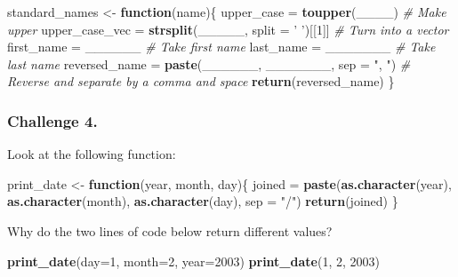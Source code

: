 \documentclass[]{book}
\newenvironment{Shaded}{\begin{snugshade}}{\end{snugshade}}
\newcommand{\KeywordTok}[1]{\textcolor[rgb]{0.13,0.29,0.53}{\textbf{#1}}}
\newcommand{\DataTypeTok}[1]{\textcolor[rgb]{0.13,0.29,0.53}{#1}}
\newcommand{\DecValTok}[1]{\textcolor[rgb]{0.00,0.00,0.81}{#1}}
\newcommand{\StringTok}[1]{\textcolor[rgb]{0.31,0.60,0.02}{#1}}
\newcommand{\CommentTok}[1]{\textcolor[rgb]{0.56,0.35,0.01}{\textit{#1}}}
\newcommand{\ControlFlowTok}[1]{\textcolor[rgb]{0.13,0.29,0.53}{\textbf{#1}}}
\newcommand{\NormalTok}[1]{#1}
\begin{document}
\begin{Shaded}
\begin{Highlighting}[]
\NormalTok{standard_names <-}\StringTok{ }\ControlFlowTok{function}\NormalTok{(name)\{}
\NormalTok{    upper_case =}\StringTok{ }\KeywordTok{toupper}\NormalTok{(____) }\CommentTok{# Make upper}
\NormalTok{    upper_case_vec =}\StringTok{ }\KeywordTok{strsplit}\NormalTok{(_____, }\DataTypeTok{split =} \StringTok{' '}\NormalTok{)[[}\DecValTok{1}\NormalTok{]] }\CommentTok{# Turn into a vector}
\NormalTok{    first_name =}\StringTok{ }\NormalTok{______ }\CommentTok{# Take first name}
\NormalTok{    last_name =}\StringTok{ }\NormalTok{_______ }\CommentTok{# Take last name}
\NormalTok{    reversed_name =}\StringTok{ }\KeywordTok{paste}\NormalTok{(______, _______, }\DataTypeTok{sep =} \StringTok{", "}\NormalTok{) }\CommentTok{# Reverse and separate by a comma and space}
    \KeywordTok{return}\NormalTok{(reversed_name)}
\NormalTok{\}}
\end{Highlighting}
\end{Shaded}

\subsubsection*{Challenge 4.}\label{challenge-4.-4}

Look at the following function:

\begin{Shaded}
\begin{Highlighting}[]
\NormalTok{print_date <-}\StringTok{ }\ControlFlowTok{function}\NormalTok{(year, month, day)\{}
\NormalTok{    joined =}\StringTok{ }\KeywordTok{paste}\NormalTok{(}\KeywordTok{as.character}\NormalTok{(year), }\KeywordTok{as.character}\NormalTok{(month), }\KeywordTok{as.character}\NormalTok{(day), }\DataTypeTok{sep =} \StringTok{"/"}\NormalTok{)}
    \KeywordTok{return}\NormalTok{(joined)}
\NormalTok{\}}
\end{Highlighting}
\end{Shaded}

Why do the two lines of code below return different values?

\begin{Shaded}
\begin{Highlighting}[]
\KeywordTok{print_date}\NormalTok{(}\DataTypeTok{day=}\DecValTok{1}\NormalTok{, }\DataTypeTok{month=}\DecValTok{2}\NormalTok{, }\DataTypeTok{year=}\DecValTok{2003}\NormalTok{)}
\KeywordTok{print_date}\NormalTok{(}\DecValTok{1}\NormalTok{, }\DecValTok{2}\NormalTok{, }\DecValTok{2003}\NormalTok{)}
\end{Highlighting}
\end{Shaded}
\end{document}
